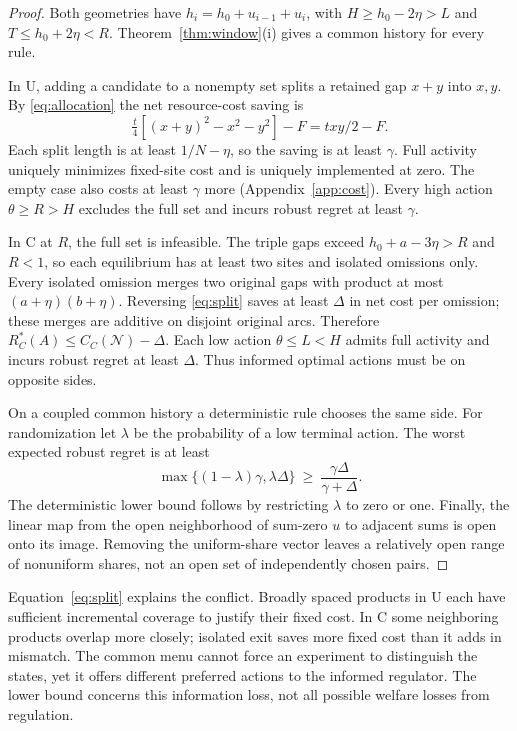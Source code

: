 \documentclass[11pt]{article}
\newcommand{\All}{\mathcal N}
\begin{document}
\begin{proof}
Both geometries have $h_i=h_0+u_{i-1}+u_i$, with $H\geq h_0-2\eta>L$ and $T\leq h_0+2\eta<R$. Theorem~\ref{thm:window}(i) gives a common history for every rule.

In U, adding a candidate to a nonempty set splits a retained gap $x+y$ into $x,y$. By \eqref{eq:allocation} the net resource-cost saving is
\begin{equation}\label{eq:split}
\tfrac t4[(x+y)^2-x^2-y^2]-F=txy/2-F.
\end{equation}
Each split length is at least $1/N-\eta$, so the saving is at least $\gamma$. Full activity uniquely minimizes fixed-site cost and is uniquely implemented at zero. The empty case also costs at least $\gamma$ more (Appendix~\ref{app:cost}). Every high action $\theta\geq R>H$ excludes the full set and incurs robust regret at least $\gamma$.

In C at $R$, the full set is infeasible. The triple gaps exceed $h_0+a-3\eta>R$ and $R<1$, so each equilibrium has at least two sites and isolated omissions only. Every isolated omission merges two original gaps with product at most $(a+\eta)(b+\eta)$. Reversing \eqref{eq:split} saves at least $\Delta$ in net cost per omission; these merges are additive on disjoint original arcs. Therefore $R_C^*(A)\leq C_C(\All)-\Delta$. Each low action $\theta\leq L<H$ admits full activity and incurs robust regret at least $\Delta$. Thus informed optimal actions must be on opposite sides.

On a coupled common history a deterministic rule chooses the same side. For randomization let $\lambda$ be the probability of a low terminal action. The worst expected robust regret is at least
\[
\max\{(1-\lambda)\gamma,\lambda\Delta\}\ \geq\ \frac{\gamma\Delta}{\gamma+\Delta}.
\]
The deterministic lower bound follows by restricting $\lambda$ to zero or one. Finally, the linear map from the open neighborhood of sum-zero $u$ to adjacent sums is open onto its image. Removing the uniform-share vector leaves a relatively open range of nonuniform shares, not an open set of independently chosen pairs.
\end{proof}

Equation~\eqref{eq:split} explains the conflict. Broadly spaced products in U each have sufficient incremental coverage to justify their fixed cost. In C some neighboring products overlap more closely; isolated exit saves more fixed cost than it adds in mismatch. The common menu cannot force an experiment to distinguish the states, yet it offers different preferred actions to the informed regulator. The lower bound concerns this information loss, not all possible welfare losses from regulation.
\end{document}
